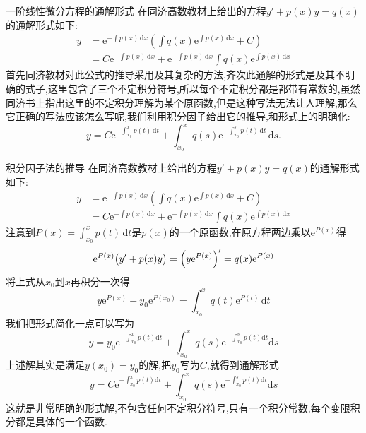 \documentclass[UTF8,no-math,12pt,openany,table,dvipsnames,svgnames]{book}
\begin{document}
\begin{MYBOX}[colbacktitle=red]{一阶线性微分方程的通解形式}
在同济高数教材上给出的方程$y'+p(x)y=q(x)$的通解形式如下:
\begin{align*}
y&=\mathrm e^{-\int p(x)\,\mathrm dx}\left(\int q(x)\mathrm e^{\int p(x)\,\mathrm dx}+C\right)\\
&=C\mathrm e^{-\int p(x)\,\mathrm dx}+\mathrm e^{-\int p(x)\,\mathrm dx}\int q(x)\mathrm e^{\int p(x)\,\mathrm dx}
\end{align*}
首先同济教材对此公式的推导采用及其复杂的方法,齐次此通解的形式是及其不明确的式子,这里包含了三个不定积分符号,所以每个不定积分都是都带有常数的,虽然同济书上指出这里的不定积分理解为某个原函数,但是这种写法无法让人理解,那么它正确的写法应该怎么写呢,我们利用积分因子给出它的推导,和形式上的明确化:
\[y=C\mathrm e^{-\int_{x_0}^xp(t)\,\mathrm dt}+\int_{x_0}^xq(s)\mathrm e^{-\int_{x_0}^sp(t)\,\mathrm dt}\,\mathrm ds.\]
\end{MYBOX}
\begin{MYBOX}[colbacktitle=red]{积分因子法的推导}
在同济高数教材上给出的方程$y'+p(x)y=q(x)$的通解形式如下:
\begin{align*}
y&=\mathrm e^{-\int p(x)\,\mathrm dx}\left(\int q(x)\mathrm e^{\int p(x)\,\mathrm dx}+C\right)\\
&=C\mathrm e^{-\int p(x)\,\mathrm dx}+\mathrm e^{-\int p(x)\,\mathrm dx}\int q(x)\mathrm e^{\int p(x)\,\mathrm dx}
\end{align*}
注意到$P(x)=\int_{x_0}^xp(t)\,\mathrm dt$是$p(x)$的一个原函数,在原方程两边乘以$\mathrm e^{P(x)}$得
\[\mathrm e^{P(x)}\bigl(y'+p(x)y\bigr)=\Bigl(y\mathrm e^{P(x)}\Bigr)'=q(x)\mathrm e^{P(x)}\]
将上式从$x_0$到$x$再积分一次得
\[y\mathrm e^{P(x)}-y_0\mathrm e^{P(x_0)}=\int_{x_0}^xq(t)\mathrm e^{P(t)}\,\mathrm dt\]
我们把形式简化一点可以写为
\[
y=y_0\text{e}^{-\int_{x_0}^x{p\left( t \right) \text{d}t}}+\int_{x_0}^x{q\left( s \right) \text{e}^{-\int_{x_0}^s{p\left( t \right) \text{d}t}}\text{d}s}
\]
上述解其实是满足$y(x_0)=y_0$的解,把$y_0$写为$C$,就得到通解形式
\[
y=C\text{e}^{-\int_{x_0}^x{p\left( t \right) \text{d}t}}+\int_{x_0}^x{q\left( s \right) \text{e}^{-\int_{x_0}^s{p\left( t \right) \text{d}t}}\text{d}s}
\]
这就是非常明确的形式解,不包含任何不定积分符号,只有一个积分常数,每个变限积分都是具体的一个函数.
\end{MYBOX}
\end{document}
